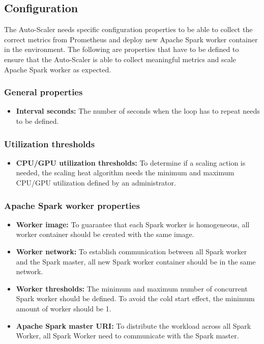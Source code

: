 

\subsection{Configuration}
\label{subsec:design-auto_scaler-configuration}
The Auto-Scaler needs specific configuration properties to be able to collect the correct metrics from Prometheus and deploy new Apache Spark worker container in the environment. The following are properties that have to be defined to ensure that the Auto-Scaler is able to collect meaningful metrics and scale Apache Spark worker as expected.

\subsubsection{General properties}

\begin{itemize}
\item \textbf{Interval seconds:} The number of seconds when the loop has to repeat needs to be defined.
\end{itemize}

\subsubsection{Utilization thresholds}

\begin{itemize}
\item \textbf{CPU/GPU utilization thresholds:} To determine if a scaling action is needed, the scaling heat algorithm needs the minimum and maximum CPU/GPU utilization defined by an administrator.
\end{itemize}

\subsubsection{Apache Spark worker properties}

\begin{itemize}
\item \textbf{Worker image:} To guarantee that each Spark worker is homogeneous, all worker container should be created with the same image.

\item \textbf{Worker network:} To establish communication between all Spark worker and the Spark master, all new Spark worker container should be in the same network.

\item \textbf{Worker thresholds:} The minimum and maximum number of concurrent Spark worker should be defined. To avoid the cold start effect, the minimum amount of worker should be 1. 

\item \textbf{Apache Spark master URI:} To distribute the workload across all Spark Worker, all Spark Worker need to communicate with the Spark master.
\end{itemize}

